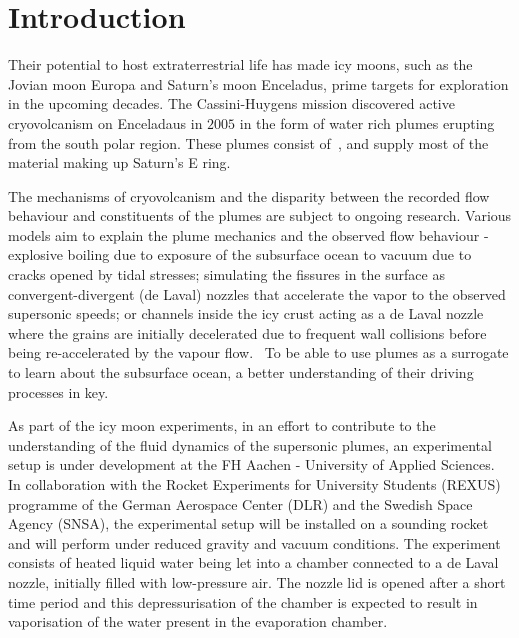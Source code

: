 \section{Introduction}
Their potential to host extraterrestrial life has made icy moons, 
 such as the Jovian moon Europa and Saturn's moon Enceladus, prime targets for
 exploration in the upcoming decades. The Cassini-Huygens mission 
 discovered active cryovolcanism on Enceladaus in $2005$ in the form of
 water rich plumes erupting from the south polar region. These plumes 
 consist of~, and supply most of the material 
 making up Saturn's E ring.~ 

The mechanisms of cryovolcanism and the disparity between the 
 recorded flow behaviour and constituents of the plumes are subject
 to ongoing research. 
 Various models aim to explain the plume mechanics and the observed 
 flow behaviour - explosive boiling due to exposure of the subsurface 
 ocean to vacuum due to 
 cracks opened by tidal stresses; simulating the 
 fissures in the surface as convergent-divergent (de Laval) nozzles that
 accelerate the vapor to the observed supersonic speeds; or channels inside
 the icy crust acting as a de Laval nozzle where the grains are 
 initially decelerated 
 due to frequent wall collisions before being re-accelerated by the 
 vapour flow.~
 To be able to use plumes as a surrogate to learn about the subsurface 
 ocean, a better 
 understanding of their driving processes in key.   

As part of the icy moon experiments, in an effort to contribute to the understanding 
 of the fluid dynamics of the supersonic plumes, an experimental setup is under
 development at the FH Aachen - University of Applied Sciences. In collaboration with the 
 Rocket Experiments for University Students (REXUS) programme of the 
 German Aerospace Center (DLR) and the Swedish Space Agency (SNSA), the experimental 
 setup will be installed on a sounding rocket and will perform under reduced gravity and 
 vacuum conditions. The experiment consists of heated liquid 
 water being let into a chamber connected to a de Laval nozzle, initially filled with 
 low-pressure air. The nozzle lid is opened after a short time period and this 
 depressurisation of the chamber is expected
 to result in vaporisation of the water present in the evaporation chamber.


